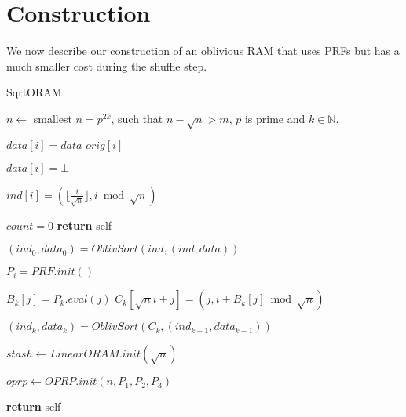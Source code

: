 
\section{Construction}

We now describe our construction of an oblivious RAM that uses PRFs
but has a much smaller cost during the shuffle step.

\begin{algorithm}
\caption{SqrtORAM}
\label{alg:oram}
\begin{algorithmic}[1]


\State $n \gets$ smallest $n= p^{2k}$, such that $n - \sqrt{n} > m$, $p$ is prime and $k \in \mathbb{N}$.

   \State $data[i] = data\_orig[i]$
\EndFor

   \State $data[i] = \bot$
\EndFor
   
    \State $ind[i]  = (\lfloor{ \frac{i}{\sqrt{n}}} \rfloor ,  i \bmod \sqrt{n}) $
\EndFor

\State $count = 0$
\State \textbf{return} self
\EndProcedure

\State


\State $(ind_0, data_0) = OblivSort(ind, (ind, data))$ \label{line:first_sort}

    \State $P_i = PRF.init()$ 

        \State $B_k[j] = P_k.eval(j)$ \label{line:prf_eval}
            \State $C_k[\sqrt{n} i + j] = (j, i + B_k[j] \bmod \sqrt{n})$
        \EndFor
    \EndFor
 
    \State $(ind_k, data_k) = OblivSort(C_k, (ind_{k-1}, data_{k-1}))$
        \label{line:second_sort}
  
\EndFor

\State $stash \gets LinearORAM.init(\sqrt{n})$

\State $oprp \gets OPRP.init(n, P_1, P_2, P_3)$

\State \textbf{return} self

\EndProcedure

\State


\end{algorithmic}
\end{algorithm}

